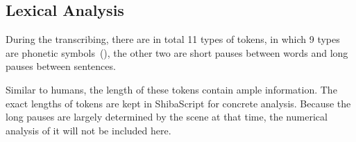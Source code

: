 



\subsection{Lexical Analysis}
During the transcribing, there are in total 11 types of tokens, in which 9 types are phonetic symbols~(), the other two are short pauses between words and long pauses between sentences. 

Similar to humans, the length of these tokens contain ample information. The exact lengths of tokens are kept in ShibaScript for concrete analysis. Because the long pauses are largely determined by the scene at that time, the numerical analysis of it will not be included here. 


